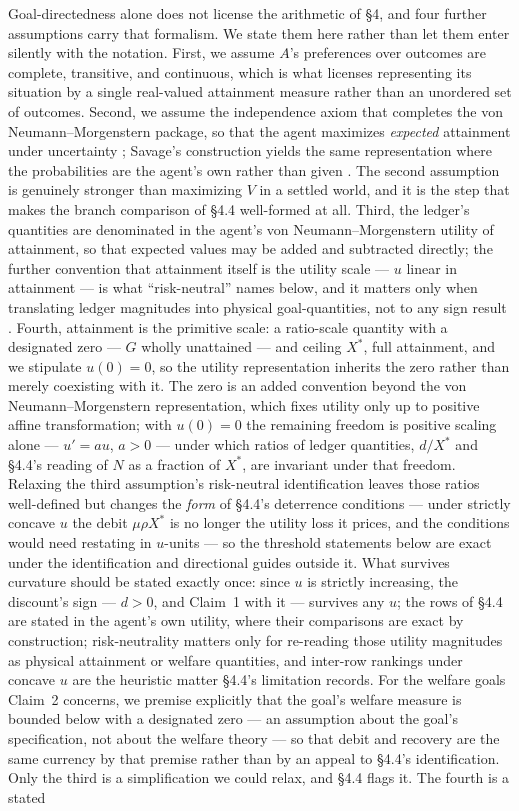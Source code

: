 \documentclass[11pt]{article}
\theoremstyle{definition}
\begin{document}
Goal-directedness alone does not license the arithmetic of \S4, and four further assumptions carry that formalism. We state them here rather than let them enter silently with the notation. First, we assume $A$'s preferences over outcomes are complete, transitive, and continuous, which is what licenses representing its situation by a single real-valued attainment measure rather than an unordered set of outcomes. Second, we assume the independence axiom that completes the von Neumann--Morgenstern package, so that the agent maximizes \emph{expected} attainment under uncertainty \cite{vonneumann1944theory}; Savage's construction yields the same representation where the probabilities are the agent's own rather than given \cite{savage1954foundations}. The second assumption is genuinely stronger than maximizing $V$ in a settled world, and it is the step that makes the branch comparison of \S4.4 well-formed at all. Third, the ledger's quantities are denominated in the agent's von Neumann--Morgenstern utility of attainment, so that expected values may be added and subtracted directly; the further convention that attainment itself is the utility scale --- $u$ linear in attainment --- is what ``risk-neutral'' names below, and it matters only when translating ledger magnitudes into physical goal-quantities, not to any sign result \cite{pratt1964risk}. Fourth, attainment is the primitive scale: a ratio-scale quantity with a designated zero --- $G$ wholly unattained --- and ceiling $X^{*}$, full attainment, and we stipulate $u(0) = 0$, so the utility representation inherits the zero rather than merely coexisting with it. The zero is an added convention beyond the von Neumann--Morgenstern representation, which fixes utility only up to positive affine transformation; with $u(0) = 0$ the remaining freedom is positive scaling alone --- $u' = au$, $a > 0$ --- under which ratios of ledger quantities, $d/X^{*}$ and \S4.4's reading of $N$ as a fraction of $X^{*}$, are invariant under that freedom. Relaxing the third assumption's risk-neutral identification leaves those ratios well-defined but changes the \emph{form} of \S4.4's deterrence conditions --- under strictly concave $u$ the debit $\mu\rho X^{*}$ is no longer the utility loss it prices, and the conditions would need restating in $u$-units --- so the threshold statements below are exact under the identification and directional guides outside it. What survives curvature should be stated exactly once: since $u$ is strictly increasing, the discount's sign --- $d > 0$, and Claim~1 with it --- survives any $u$; the rows of \S4.4 are stated in the agent's own utility, where their comparisons are exact by construction; risk-neutrality matters only for re-reading those utility magnitudes as physical attainment or welfare quantities, and inter-row rankings under concave $u$ are the heuristic matter \S4.4's limitation records. For the welfare goals Claim~2 concerns, we premise explicitly that the goal's welfare measure is bounded below with a designated zero --- an assumption about the goal's specification, not about the welfare theory --- so that debit and recovery are the same currency by that premise rather than by an appeal to \S4.4's identification. Only the third is a simplification we could relax, and \S4.4 flags it. The fourth is a stated 
\end{document}
